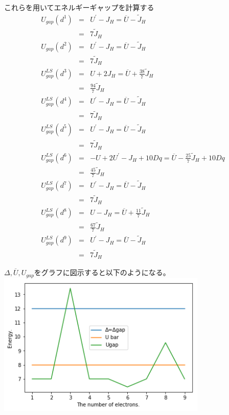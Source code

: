 \documentclass{jsarticle}
\begin{document}
これらを用いてエネルギーギャップを計算する
\begin{eqnarray}
  U_{gap}(d^1) &=& U^{\prime} - J_H = \overline{U} - \tilde{J}_H \nonumber \\
  &=& 7\tilde{J}_H \nonumber \\
  U_{gap}(d^2) &=& U^{\prime} - J_H = \overline{U} - \tilde{J}_H \nonumber \\
  &=& 7\tilde{J}_H \nonumber \\
  U_{gap}^{LS}(d^3) &=& U + 2J_H = \overline{U} + \frac{38}{7}\tilde{J}_H \nonumber \\
  &=& \frac{94}{7}\tilde{J}_H \nonumber \\
  U_{gap}^{LS}(d^4) &=& U^{\prime} - J_H = \overline{U} - \tilde{J}_H \nonumber \\
  &=& 7\tilde{J}_H \nonumber \\
  U_{gap}^{LS}(d^5) &=& U^{\prime} - J_H = \overline{U} - \tilde{J}_H \nonumber \\
  &=& 7\tilde{J}_H \nonumber \\
  U_{gap}^{LS}(d^6) &=& -U + 2U^{\prime} - J_H + 10Dq = \overline{U} - \frac{25}{7}\tilde{J}_H + 10Dq \nonumber \\
  &=& \frac{45}{7} \tilde{J}_H \nonumber \\
  U_{gap}^{LS}(d^7) &=& U^{\prime} - J_H = \overline{U} - \tilde{J}_H \nonumber \\
  &=& 7\tilde{J}_H \nonumber \\
  U_{gap}^{LS}(d^8) &=& U - J_H = \overline{U} + \frac{11}{7}\tilde{J}_H \nonumber \\
  &=& \frac{67}{7} \tilde{J}_H \nonumber \\
  U_{gap}^{LS}(d^9) &=& U^{\prime} - J_H = \overline{U} - \tilde{J}_H \nonumber \\
  &=& 7\tilde{J}_H \nonumber
\end{eqnarray}

$\Delta, \overline{U}, U_{gap}$をグラフに図示すると以下のようになる。 \\
\includegraphics[width=10cm]{graph02.png}
\end{document}
